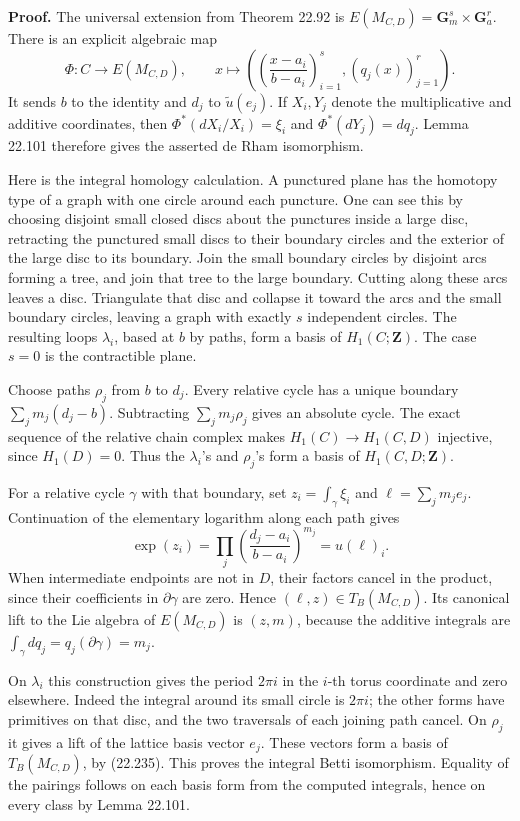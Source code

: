 \documentclass[
  11pt,
  a4paper,
]{article}
\begin{document}
\textbf{Proof.} The universal extension from Theorem 22.92 is
\(E(M_{C,D})=\mathbf G_m^s\times\mathbf G_a^r\). There is an explicit
algebraic map \[
 \Phi:C\longrightarrow E(M_{C,D}),\qquad
 x\longmapsto
 \left(\left(\frac{x-a_i}{b-a_i}\right)_{i=1}^s,
                  (q_j(x))_{j=1}^r\right).
 \tag{22.255}
\] It sends \(b\) to the identity and \(d_j\) to \(\widetilde u(e_j)\).
If \(X_i,Y_j\) denote the multiplicative and additive coordinates, then
\(\Phi^*(dX_i/X_i)=\xi_i\) and \(\Phi^*(dY_j)=dq_j\). Lemma 22.101
therefore gives the asserted de Rham isomorphism.

Here is the integral homology calculation. A punctured plane has the
homotopy type of a graph with one circle around each puncture. One can
see this by choosing disjoint small closed discs about the punctures
inside a large disc, retracting the punctured small discs to their
boundary circles and the exterior of the large disc to its boundary.
Join the small boundary circles by disjoint arcs forming a tree, and
join that tree to the large boundary. Cutting along these arcs leaves a
disc. Triangulate that disc and collapse it toward the arcs and the
small boundary circles, leaving a graph with exactly \(s\) independent
circles. The resulting loops \(\lambda_i\), based at \(b\) by paths,
form a basis of \(H_1(C;\mathbf Z)\). The case \(s=0\) is the
contractible plane.

Choose paths \(\rho_j\) from \(b\) to \(d_j\). Every relative cycle has
a unique boundary \(\sum_jm_j(d_j-b)\). Subtracting \(\sum_jm_j\rho_j\)
gives an absolute cycle. The exact sequence of the relative chain
complex makes \(H_1(C)\to H_1(C,D)\) injective, since \(H_1(D)=0\). Thus
the \(\lambda_i\)'s and \(\rho_j\)'s form a basis of
\(H_1(C,D;\mathbf Z)\).

For a relative cycle \(\gamma\) with that boundary, set
\(z_i=\int_\gamma\xi_i\) and \(\ell=\sum_jm_je_j\). Continuation of the
elementary logarithm along each path gives \[
 \exp(z_i)=\prod_j
       \left(\frac{d_j-a_i}{b-a_i}\right)^{m_j}=u(\ell)_i.
 \tag{22.256}
\] When intermediate endpoints are not in \(D\), their factors cancel in
the product, since their coefficients in \(\partial\gamma\) are zero.
Hence \((\ell,z)\in T_B(M_{C,D})\). Its canonical lift to the Lie
algebra of \(E(M_{C,D})\) is \((z,m)\), because the additive integrals
are \(\int_\gamma dq_j=q_j(\partial\gamma)=m_j\).

On \(\lambda_i\) this construction gives the period \(2\pi i\) in the
\(i\)-th torus coordinate and zero elsewhere. Indeed the integral around
its small circle is \(2\pi i\); the other forms have primitives on that
disc, and the two traversals of each joining path cancel. On \(\rho_j\)
it gives a lift of the lattice basis vector \(e_j\). These vectors form
a basis of \(T_B(M_{C,D})\), by (22.235). This proves the integral Betti
isomorphism. Equality of the pairings follows on each basis form from
the computed integrals, hence on every class by Lemma 22.101.
\end{document}

